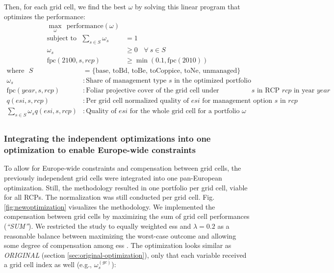\documentclass[]{article}
\begin{document}
\noindent Then, for each grid cell, we find the best $\omega$ by solving this linear program that optimizes the performance:
\begin{align}
	\max_\omega ~~ \mbox{performance}(\omega) & \\
	\text{subject to} ~~~ \sum_{s\in{}S}\omega_s 	&= 1 \label{eq:sum_one} \\
	\omega_s 					&\geq 0  ~~~~ \forall ~ s \in S \label{eq:positive} \\
	\text{fpc}(2100, s, rcp) 	&\geq \min(0.1, \text{fpc}(2010))  \label{eq:fpc}
\end{align}
\begin{align*}
	\text{where} ~~~S &=\{\text{base, toBd, toBe, toCoppice, toNe, unmanaged}\} \\
	\omega_s &: \text{Share of management type $s$ in the optimized portfolio} \\
	\text{fpc}(year, s, rcp) &: \text{Foliar projective cover of the grid cell under management option $s$ in RCP $rcp$ in year $year$} \\
	q(esi, s, rcp) &: \text{Per grid cell normalized quality of $esi$ for management option $s$ in $rcp$} \\
	\sum_{s\in{}S} \omega_s q(esi, s, rcp) &: \text{Quality of $esi$ for the whole grid cell for a portfolio $\omega$} \\
\end{align*}

\subsubsection{Integrating the independent optimizations into one optimization to enable Europe-wide constraints}\label{sec:optimizations-combined}
To allow for Europe-wide constraints and compensation between grid cells, the previously independent grid cells were integrated into one pan-European optimization.
Still, the methodology resulted in one portfolio per grid cell, viable for all RCPs. The normalization was still conducted per grid cell. Fig. \ref{fig:newoptimization} visualizes the methodology.
We implemented the compensation between grid cells by maximizing the sum of grid cell performances (\textit{``SUM''}). We restricted the study to equally weighted \glspl{es} and $\lambda=0.2$ as a reasonable balance between maximizing the worst-case outcome and allowing some degree of compensation among \glspl{es} \parencite{Diaz-Balteiro2018}.
The optimization looks similar as \textit{ORIGINAL} (section \ref{sec:original-optimization}), only that each variable received a grid cell index as well (e.g., $\omega_s^{(gc)}$):
\end{document}
